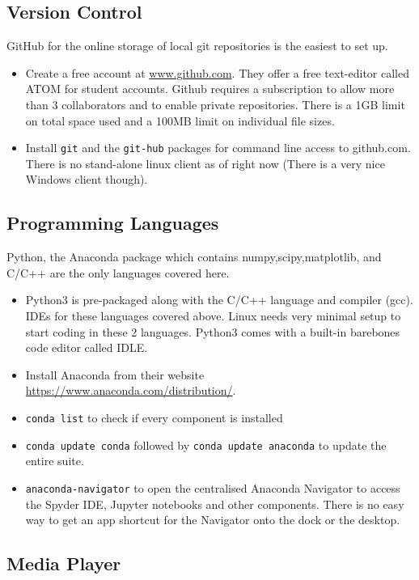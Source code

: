 \documentclass[12pt,letterpaper]{article}
\begin{document}
\subsection{Version Control}

GitHub for the online storage of local git repositories is the easiest to set up.

\begin{itemize}
	\item Create a free account at \url{www.github.com}. They offer a free text-editor called ATOM for student accounts. Github requires a subscription to allow more than 3 collaborators and to enable private repositories. There is a 1GB limit on total space used and a 100MB limit on individual file sizes.
	\item Install \texttt{git} and the \texttt{git-hub} packages for command line access to github.com. There is no stand-alone linux client as of right now (There is a very nice Windows client though).
\end{itemize}

\subsection{Programming Languages}
Python, the Anaconda package which contains numpy,scipy,matplotlib, and C/C++ are the only languages covered here.

\begin{itemize}
	\item Python3 is pre-packaged along with the C/C++ language and compiler (gcc). IDEs for these languages covered above. Linux needs very minimal setup to start coding in these 2 languages. Python3 comes with a built-in barebones code editor called IDLE. 
	\item Install Anaconda from their website \\ \url{https://www.anaconda.com/distribution/}. 
	\item \texttt{conda list} to check if every component is installed
	\item \texttt{conda update conda} followed by \texttt{conda update anaconda} to update the entire suite.
	\item \texttt{anaconda-navigator} to open the centralised Anaconda Navigator to access the Spyder IDE, Jupyter notebooks and other components. There is no easy way to get an app shortcut for the Navigator onto the dock or the desktop.
\end{itemize}

\subsection{Media Player}
\end{document}
